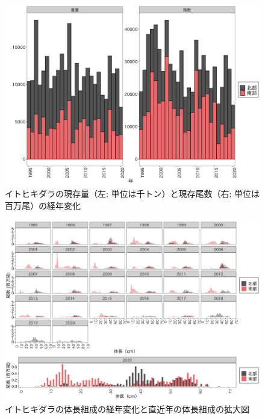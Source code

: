 \documentclass[11pt]{article} %
\begin{document}
\begin{linenumbers}
\begin{figure}[h]
  \centering
  \includegraphics[width = 14cm]{イトヒキダラtrend.png}
  \caption{イトヒキダラの現存量（左; 単位は千トン）と現存尾数（右; 単位は百万尾）の経年変化}
\end{figure}

\begin{figure}[h]
  \centering
  \includegraphics[width = 14cm]{イトヒキダラlength.png}
  \caption{イトヒキダラの体長組成の経年変化と直近年の体長組成の拡大図}
\end{figure}


\end{linenumbers}
\end{document}
